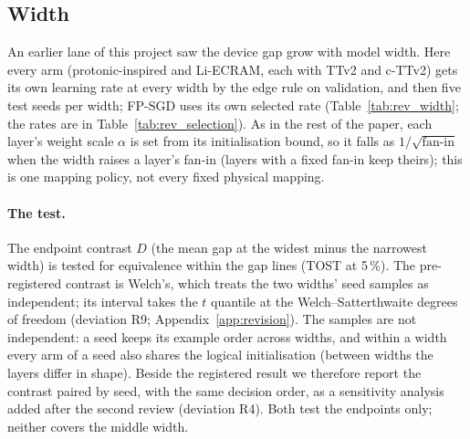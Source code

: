 \subsection{Width}\label{sec:scale}
An earlier lane of this project saw the device gap grow with model width. Here every arm (protonic-inspired and Li-ECRAM, each
with TTv2 and c-TTv2) gets its own learning rate at every width by the edge rule on validation, and then five test seeds per
width; FP-SGD uses its own selected rate (Table~\ref{tab:rev_width}; the rates are in Table~\ref{tab:rev_selection}). As in the
rest of the paper, each layer's weight scale $\alpha$ is set from its initialisation bound, so it falls as $1/\sqrt{\text{fan-in}}$
when the width raises a layer's fan-in (layers with a fixed fan-in keep theirs); this is one mapping policy, not every fixed
physical mapping.

\paragraph{The test.} The endpoint contrast $D$ (the mean gap at the widest minus the narrowest width) is tested for
equivalence within the gap lines (TOST at 5\,\%).  The pre-registered contrast is Welch's, which treats the two widths' seed samples as independent; its interval takes the
$t$ quantile at the Welch--Satterthwaite degrees of freedom (deviation R9; Appendix~\ref{app:revision}). The samples are not independent: a seed keeps its example order across widths, and
within a width every arm of a seed also shares the logical initialisation (between widths the layers differ in shape). Beside the
registered result we therefore report the contrast paired by seed, with the same decision order, as a sensitivity analysis
added after the second review (deviation R4). Both test the endpoints only; neither covers the middle width.


